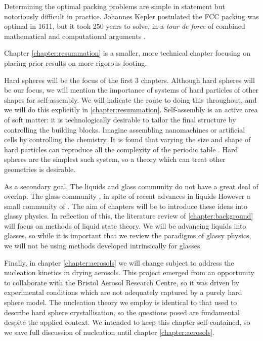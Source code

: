 \documentclass[11pt,twoside]{report}
\def\includebibliography{}
\begin{document}
Determining the optimal packing problems are simple in statement \cite{Cohn2016,Conway1999} but notoriously difficult in practice.
Johannes Kepler postulated the FCC packing was optimal in 1611, but it took 250 years to solve, in a \emph{tour de force} of combined mathematical and computational arguments \cite{HalesAM2005}.

Chapter \ref{chapter:resummation} is a smaller, more technical chapter focusing on placing prior results on more rigorous footing.

Hard spheres will be the focus of the first 3 chapters.
Although hard spheres will be our focus, we will mention the importance of systems of hard particles of other shapes for self-assembly.
We will indicate the route to doing this throughout, and we will do this explicitly in \ref{chapter:resummation}.
Self-assembly is an active area of soft matter: it is technologically desirable to tailor the final structure by controlling the building blocks.
Imagine assembling nanomachines or artificial cells by controlling the chemistry.
It is found that varying the size and shape of hard particles can reproduce all the complexity of the periodic table \cite{Glotzer?,Dijkstra?}.
Hard spheres are the simplest such system, so a theory which can treat other geometries is desirable.

As a secondary goal, The liquids and glass community do not have a great deal of overlap.
The glass community , in spite of recent advances in liquids
However a small community of .
The aim of chapters will be to introduce these ideas into glassy physics.
In reflection of this, the literature review of \ref{chapter:background} will focus on methods of liquid state theory.
We will be advancing liquids into glasses, so while it is important that we review the paradigms of glassy physics, we will not be using methods developed intrinsically for glasses.

Finally, in chapter \ref{chapter:aerosols} we will change subject to address the nucleation kinetics in drying aerosols.
This project emerged from an opportunity to collaborate with the Bristol Aerosol Research Centre, so it was driven by experimental conditions which are not adequately captured by a purely hard sphere model.
The nucleation theory we employ is identical to that used to describe hard sphere crystallisation, so the questions posed are fundamental despite the applied context.
We intended to keep this chapter self-contained, so we save full discussion of nucleation until chapter \ref{chapter:aerosols}.

\ifdefined\includebibliography
  \printbibliography
\fi
  
\end{document}

